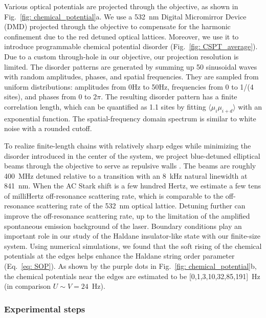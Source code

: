 \documentclass[preprint,superscriptaddress,floatfix, nofootinbib]{revtex4-2}
\begin{document}
Various optical potentials are projected through the objective, as shown in Fig.~\ref{fig: chemical_potential}a. We use a 532~nm Digital Micromirror Device (DMD) projected through the objective to compensate for the harmonic confinement due to the red detuned optical lattices. Moreover, we use it to introduce programmable chemical potential disorder (Fig.~\ref{fig: CSPT_average}). Due to a custom through-hole in our objective, our projection resolution is limited. The disorder patterns are generated by summing up 50 sinusoidal waves with random amplitudes, phases, and spatial frequencies. They are sampled from uniform distributions: amplitudes from 0Hz to 50Hz, frequencies from 0 to 1/(4 sites), and phases from 0 to $2\pi$. The resulting disorder pattern has a finite correlation length, which can be quantified as 1.1 sites by fitting $\langle\mu_i \mu_{i+d}\rangle$ with an exponential function. The spatial-frequency domain spectrum is similar to white noise with a rounded cutoff.

To realize finite-length chains with relatively sharp edges while minimizing the disorder introduced in the center of the system, we project blue-detuned elliptical beams through the objective to serve as repulsive walls \cite{Gaunt2013}. The beams are roughly 400~MHz detuned relative to a transition with an 8~kHz natural linewidth at 841~nm. When the AC Stark shift is a few hundred Hertz, we estimate a few tens of milliHertz off-resonance scattering rate, which is comparable to the off-resonance scattering rate of the 532~nm optical lattice. Detuning further can improve the off-resonance scattering rate, up to the limitation of the amplified spontaneous emission background of the laser. Boundary conditions play an important role in our study of the Haldane insulator-like state with our finite-size system. Using numerical simulations, we found that the soft rising of the chemical potentials at the edges helps enhance the Haldane string order parameter (Eq.~\eqref{eq: SOP}). As shown by the purple dots in Fig.~\ref{fig: chemical_potential}b, the chemical potentials near the edges are estimated to be [0,1,3,10,32,85,191]~Hz (in comparison $U\sim V=24$~Hz).

\subsubsection*{Experimental steps}
\end{document}
